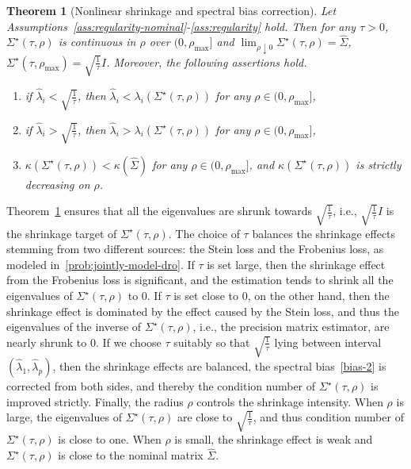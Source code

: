 \documentclass[11pt]{article}
\newtheorem{theorem}{Theorem}
\newcommand{\opt}{^\star}
\newcommand{\wh}{\widehat}
\begin{document}
\begin{theorem}[Nonlinear shrinkage and spectral bias correction]\label{thm:nonlinear-shrinkage}
    Let Assumptions~\ref{ass:regularity-nominal}-\ref{ass:regularity} hold. Then for any $\tau>0$, $\Sigma\opt(\tau, \rho)$ is continuous in $\rho$ over $(0,  \rho_{\max}]$ and  $\lim_{ \rho\downarrow 0}\Sigma\opt(\tau, \rho)=\wh\Sigma$, $\Sigma\opt(\tau, \rho_{\max})=\sqrt{\frac{1}{\tau}}I$. Moreover, the following assertions hold. 
    \begin{enumerate}[label=(\roman*)]
        \item if $\wh\lambda_i < \sqrt{\frac{1}{\tau}}$, then $\wh\lambda_i < \lambda_i(\Sigma\opt(\tau,\rho))$ for any $\rho\in (0,\rho_{\max}]$,
        \item if $\wh\lambda_i > \sqrt{\frac{1}{\tau}}$, then $\wh\lambda_i > \lambda_i(\Sigma\opt(\tau,\rho))$ for any $\rho\in (0, \rho_{\max}]$,
        \item $\kappa(\Sigma\opt(\tau, \rho)) < \kappa(\wh\Sigma)$ for any $\rho\in(0, \rho_{\max}]$, and $\kappa(\Sigma\opt(\tau, \rho))$ is strictly decreasing on $ \rho$.
    \end{enumerate}
\end{theorem}
Theorem~\ref{thm:nonlinear-shrinkage} ensures that all the eigenvalues are shrunk towards $\sqrt{\frac{1}{\tau}}$, i.e., $\sqrt{\frac{1}{\tau}}I$ is the shrinkage target of $\Sigma\opt(\tau, \rho)$. The choice of $\tau$ balances the shrinkage effects stemming from two different sources: the Stein loss and the Frobenius loss, as modeled in~\eqref{prob:jointly-model-dro}. If $\tau$ is set large, then the shrinkage effect 
from the Frobenius loss is significant, and the estimation tends to shrink all the eigenvalues of $\Sigma\opt(\tau, \rho)$ to $0$. If $\tau$ is set close to $0$, on the other hand, then the shrinkage effect is dominated by the effect 
caused by the Stein loss, and thus the eigenvalues of the inverse of $\Sigma\opt(\tau, \rho)$, i.e., the precision matrix estimator, are nearly shrunk to $0$. 
If we choose $\tau$ suitably so that $\sqrt{\frac{1}{\tau}}$ lying between interval $(\wh\lambda_1, \wh\lambda_p)$, then the shrinkage effects are balanced, the spectral bias~\eqref{bias-2} is corrected from both sides, and thereby the condition number of $\Sigma\opt(\tau, \rho)$ is improved strictly. 
Finally, the radius $ \rho$ controls the shrinkage intensity. When $ \rho$ is large, the eigenvalues of $\Sigma\opt(\tau, \rho)$ are close to $\sqrt{\frac{1}{\tau}}$, and thus condition number of $\Sigma\opt(\tau, \rho)$ is close to one. When $ \rho$ is small, the shrinkage effect is weak and $\Sigma\opt(\tau, \rho)$ is close to the nominal matrix $\wh\Sigma$.
\end{document}
